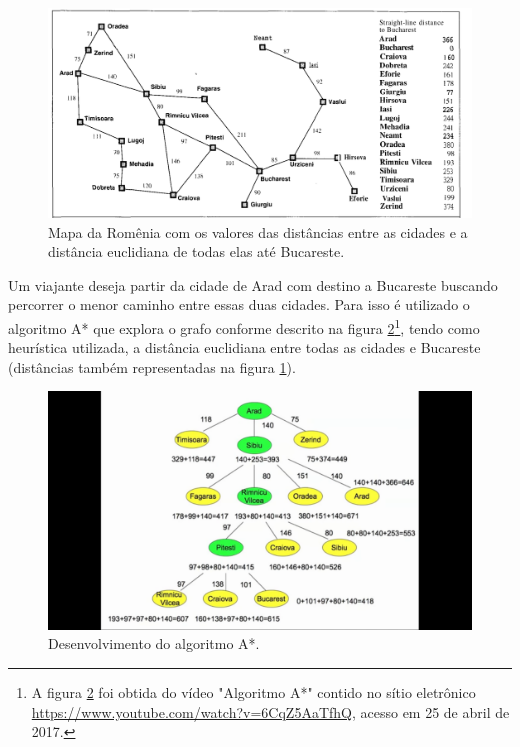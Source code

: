 \begin{figure}[H]
\centering
\includegraphics[width=.90\textwidth]{figuras/Aestrela-mapa1} 
\caption{Mapa da Romênia com os valores das distâncias entre as cidades e a distância euclidiana de todas elas até Bucareste.}
\label{fig-aestrela-algoritmo-mapa1}
\end{figure}

Um viajante deseja partir da cidade de Arad com destino a Bucareste buscando percorrer o menor caminho entre essas duas cidades. Para isso é utilizado o algoritmo A* que explora o grafo conforme descrito na figura \ref{fig-aestrela-algoritmo-mapa2}\footnote{A figura \ref{fig-aestrela-algoritmo-mapa2} foi obtida do vídeo "Algoritmo A*" contido no sítio eletrônico \url{https://www.youtube.com/watch?v=6CqZ5AaTfhQ}, acesso em 25 de abril de 2017.}, tendo como heurística utilizada, a distância euclidiana entre todas as cidades e Bucareste (distâncias também representadas na figura \ref{fig-aestrela-algoritmo-mapa1}).

\begin{figure}[H]
\centering
\includegraphics[width=.90\textwidth]{figuras/Aestrela-mapa2} 
\caption{Desenvolvimento do algoritmo A*.}
\label{fig-aestrela-algoritmo-mapa2}
\end{figure}


